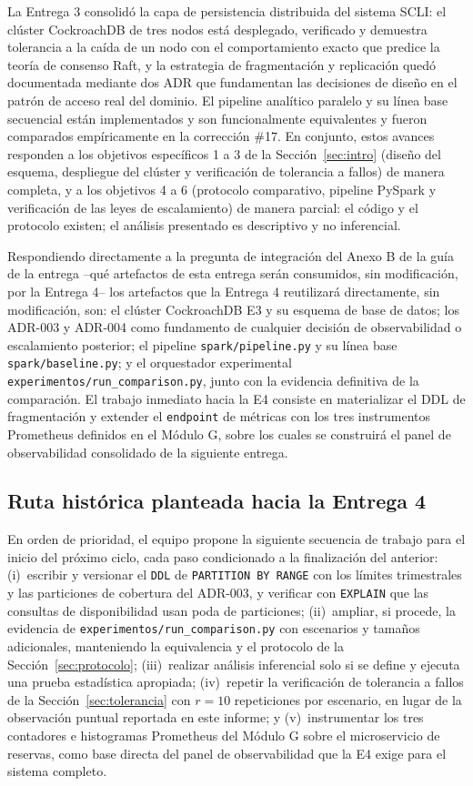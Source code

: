\documentclass[10pt,twocolumn]{article}
\begin{document}
La Entrega 3 consolidó la capa de persistencia distribuida del sistema
SCLI: el clúster CockroachDB de tres nodos está desplegado, verificado y
demuestra tolerancia a la caída de un nodo con el comportamiento exacto que
predice la teoría de consenso Raft, y la estrategia de fragmentación y
replicación quedó documentada mediante dos ADR que fundamentan las
decisiones de diseño en el patrón de acceso real del dominio. El pipeline
analítico paralelo y su línea base secuencial están implementados y son
funcionalmente equivalentes y fueron comparados empíricamente en la
corrección \#17. En conjunto, estos avances responden a los objetivos
específicos 1 a 3 de la Sección~\ref{sec:intro} (diseño del esquema,
despliegue del clúster y verificación de tolerancia a fallos) de manera
completa, y a los objetivos 4 a 6 (protocolo comparativo, pipeline PySpark
y verificación de las leyes de escalamiento) de manera parcial: el código
y el protocolo existen; el análisis presentado es descriptivo y no inferencial.

Respondiendo directamente a la pregunta de integración del Anexo B de la
guía de la entrega --qué artefactos de esta entrega serán consumidos, sin
modificación, por la Entrega 4-- los artefactos que la Entrega 4
reutilizará directamente, sin modificación, son: el clúster CockroachDB E3
y su esquema de base de datos;
los ADR-003 y ADR-004 como fundamento de cualquier decisión de observabilidad
o escalamiento posterior; el pipeline \texttt{spark/pipeline.py} y su línea
base \texttt{spark/baseline.py}; y el orquestador experimental
\texttt{experimentos/run\_comparison.py}, junto con la evidencia definitiva
de la comparación. El trabajo inmediato hacia la E4 consiste en materializar
el DDL de fragmentación y extender el
\texttt{endpoint} de métricas con los tres instrumentos Prometheus
definidos en el Módulo G, sobre los cuales se construirá el panel de
observabilidad consolidado de la siguiente entrega.

\subsection{Ruta histórica planteada hacia la Entrega 4}

En orden de prioridad, el equipo propone la siguiente secuencia de trabajo
para el inicio del próximo ciclo, cada paso condicionado a la finalización
del anterior: (i)~escribir y versionar el \texttt{DDL} de
\texttt{PARTITION BY RANGE} con los límites trimestrales y las particiones
de cobertura del ADR-003, y verificar con \texttt{EXPLAIN} que las
consultas de disponibilidad usan poda de particiones; (ii)~ampliar, si
procede, la evidencia de \texttt{experimentos/run\_comparison.py} con
escenarios y tamaños adicionales, manteniendo la equivalencia y el protocolo
de la Sección~\ref{sec:protocolo}; (iii)~realizar análisis inferencial solo si
se define y ejecuta una prueba estadística apropiada;
(iv)~repetir la verificación de tolerancia a fallos de la
Sección~\ref{sec:tolerancia} con $r=10$ repeticiones por escenario, en
lugar de la observación puntual reportada en este informe; y
(v)~instrumentar los tres contadores e histogramas Prometheus del Módulo G
sobre el microservicio de reservas, como base directa del panel de
observabilidad que la E4 exige para el sistema completo.
\end{document}
